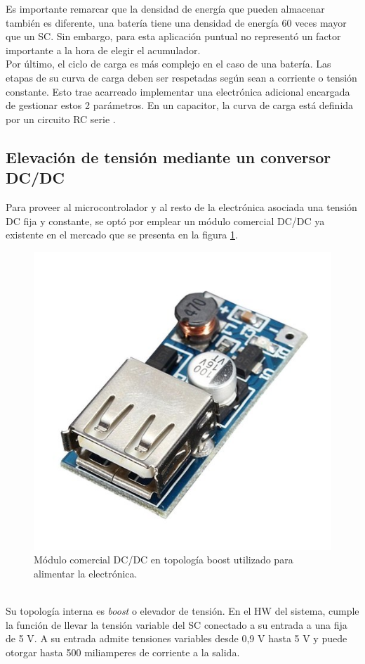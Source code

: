 Es importante remarcar que la densidad de energía que pueden almacenar también es diferente, una batería tiene una densidad de energía 60 veces mayor que un SC. Sin embargo, para esta aplicación puntual no representó un factor importante a la hora de elegir el acumulador.\\
Por último, el ciclo de carga es más complejo en el caso de una batería. Las etapas de su curva de carga deben ser respetadas según sean a corriente o tensión constante. Esto trae acarreado implementar una electrónica adicional encargada de gestionar estos 2 parámetros. En un capacitor, la curva de carga está definida por un circuito RC serie \citep{ceraolo2014fundamentals}.\\ 

\subsection{Elevación de tensión mediante un conversor DC/DC }
Para proveer al microcontrolador y al resto de la electrónica asociada una tensión DC fija y constante, se optó por emplear un módulo comercial DC/DC ya existente en el mercado que se presenta en la figura \ref{fig:dcdcboost}.\\
\begin{figure}[h!]
	\centering
	\includegraphics[width=0.4\linewidth]{Figures/dcdc_boost}
	\caption{Módulo comercial DC/DC en topología boost utilizado para alimentar la electrónica.}
	\label{fig:dcdcboost}
\end{figure}\\
Su topología interna es \textit{boost} o elevador de tensión. En el HW del sistema, cumple la función de llevar la tensión variable del SC conectado a su entrada a una fija de 5 V. 
A su entrada admite tensiones variables desde 0,9 V hasta 5 V y puede otorgar hasta 500 miliamperes de corriente a la salida.

